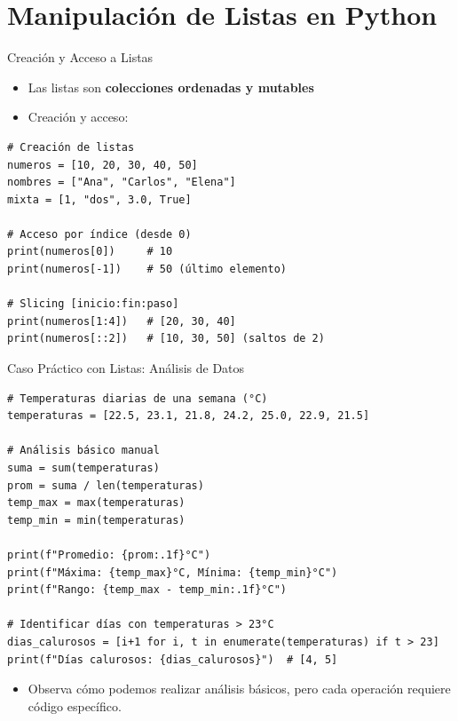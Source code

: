 \documentclass[10pt]{beamer}
\begin{document}
\section{Manipulación de Listas en Python}

\begin{frame}[fragile]{Creación y Acceso a Listas}
  \begin{itemize}
    \item Las listas son \textbf{colecciones ordenadas y mutables}
    \item Creación y acceso:
  \end{itemize}
\begin{verbatim}
# Creación de listas
numeros = [10, 20, 30, 40, 50]
nombres = ["Ana", "Carlos", "Elena"]
mixta = [1, "dos", 3.0, True]

# Acceso por índice (desde 0)
print(numeros[0])     # 10
print(numeros[-1])    # 50 (último elemento)

# Slicing [inicio:fin:paso]
print(numeros[1:4])   # [20, 30, 40]
print(numeros[::2])   # [10, 30, 50] (saltos de 2)
\end{verbatim}
\end{frame}

\iffalse
\begin{frame}[fragile]{Caso Práctico con Listas: Análisis de Datos}
\begin{verbatim}
# Temperaturas diarias de una semana (°C)
temperaturas = [22.5, 23.1, 21.8, 24.2, 25.0, 22.9, 21.5]

# Análisis básico manual
suma = sum(temperaturas)
prom = suma / len(temperaturas)
temp_max = max(temperaturas)
temp_min = min(temperaturas)

print(f"Promedio: {prom:.1f}°C")
print(f"Máxima: {temp_max}°C, Mínima: {temp_min}°C")
print(f"Rango: {temp_max - temp_min:.1f}°C")

# Identificar días con temperaturas > 23°C
dias_calurosos = [i+1 for i, t in enumerate(temperaturas) if t > 23]
print(f"Días calurosos: {dias_calurosos}")  # [4, 5]
\end{verbatim}
\begin{itemize}
  \item Observa cómo podemos realizar análisis básicos, pero cada operación requiere código específico.
\end{itemize}
\end{frame}
\end{document}

